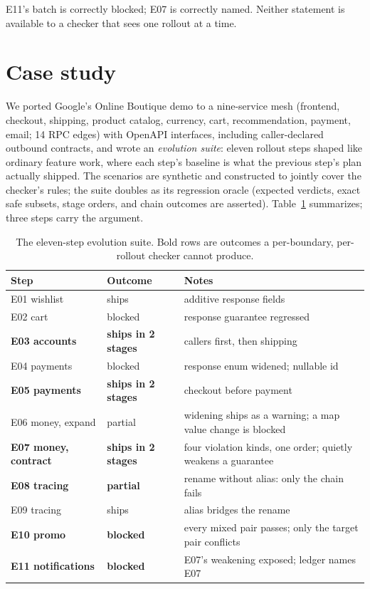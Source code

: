 \noindent E11's batch is correctly blocked; E07 is correctly
named. Neither statement is available to a checker that sees one
rollout at a time.

\section{Case study}
\label{sec:casestudy}

We ported Google's Online Boutique demo to a nine-service mesh
(frontend, checkout, shipping, product catalog, currency, cart,
recommendation, payment, email; 14 RPC edges) with OpenAPI interfaces,
including caller-declared outbound contracts, and wrote an
\emph{evolution suite}: eleven rollout steps shaped like ordinary
feature work, where each step's baseline is what the previous step's
plan actually shipped. The scenarios are synthetic and constructed to
jointly cover the checker's rules; the suite doubles as its regression
oracle (expected verdicts, exact safe subsets, stage orders, and chain
outcomes are asserted). Table~\ref{tab:steps} summarizes; three steps
carry the argument.

\begin{table}
\caption{The eleven-step evolution suite. Bold rows are outcomes a
per-boundary, per-rollout checker cannot produce.}
\label{tab:steps}
\small
\begin{tabular}{@{}llp{3.6cm}@{}}
\toprule
Step & Outcome & Notes\\
\midrule
E01 wishlist & ships & additive response fields\\
E02 cart & blocked & response guarantee regressed\\
\textbf{E03 accounts} & \textbf{ships in 2 stages} & callers first, then shipping\\
E04 payments & blocked & response enum widened; nullable id\\
\textbf{E05 payments} & \textbf{ships in 2 stages} & checkout before payment\\
E06 money, expand & partial & widening ships as a warning; a map value change is blocked\\
\textbf{E07 money, contract} & \textbf{ships in 2 stages} & four violation kinds, one order; quietly weakens a guarantee\\
\textbf{E08 tracing} & \textbf{partial} & rename without alias: only the chain fails\\
E09 tracing & ships & alias bridges the rename\\
\textbf{E10 promo} & \textbf{blocked} & every mixed pair passes; only the target pair conflicts\\
\textbf{E11 notifications} & \textbf{blocked} & E07's weakening exposed; ledger names E07\\
\bottomrule
\end{tabular}
\end{table}

